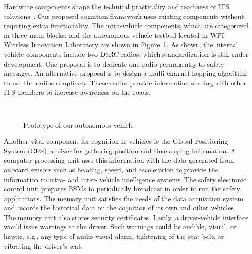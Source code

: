 \documentclass[journal, 11pt]{IEEEtran}
\begin{document}
Hardware components shape the technical practicality and readiness of ITS
solutions~\cite{hardingNHTSA14}. Our proposed cognition framework uses existing
components without requiring extra functionality. The intra-vehicle components,
which are categorized in three main blocks, and the autonomous vehicle testbed
located in WPI Wireless Innovation Laboratory are shown in
Figure~\ref{fig:overall-prototype}. As shown, the internal vehicle components
include two DSRC radios, which standardization is still under development. One
proposal is to dedicate one radio permanently to safety messages. An alternative
proposal is to design a multi-channel hopping algorithm to use the radios
adaptively. These radios provide information sharing with other ITS members to
increase awareness on the roads.

\begin{figure}[ht]
  \quad
  ~
  ~
  \vspace*{-4mm}
  \caption{Prototype of our autonomous vehicle}
  \label{fig:overall-prototype}
  \vspace*{-6mm}
\end{figure}

Another vital component for cognition in vehicles is the Global Positioning
System (GPS) receiver for gathering position and timekeeping information. A
computer processing unit uses this information with the data generated from
onboard sensors such as heading, speed, and acceleration to provide the
information to intra- and inter- vehicle intelligence systems. The safety
electronic control unit prepares BSMs to periodically broadcast in order to run
the safety applications. The memory unit satisfies the needs of the data
acquisition system and records the historical data on the cognition of its
own and other vehicles. The memory unit also stores security certificates.
Lastly, a driver-vehicle interface would issue warnings to the driver. Such
warnings could be audible, visual, or haptic, e.g., any type of audio-visual
alarm, tightening of the seat belt, or vibrating the driver's seat.
\end{document}
